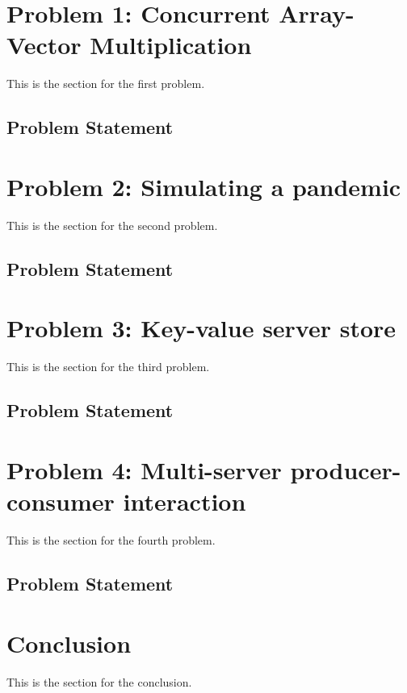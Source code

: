 \documentclass[acmlarge]{acmart}
\begin{document}
\section{Problem 1: Concurrent Array-Vector Multiplication}
\label{section:problem1}
This is the section for the first problem.
\subsection{Problem Statement}

\section{Problem 2: Simulating a pandemic}
\label{section:problem2}
This is the section for the second problem.
\subsection{Problem Statement}

\section{Problem 3: Key-value server store}
\label{section:problem3}
This is the section for the third problem.
\subsection{Problem Statement}

\section{Problem 4: Multi-server producer-consumer interaction}
\label{section:problem4}
This is the section for the fourth problem.
\subsection{Problem Statement}

\section{Conclusion}
\label{section:conclusion}
This is the section for the conclusion.
\end{document}
